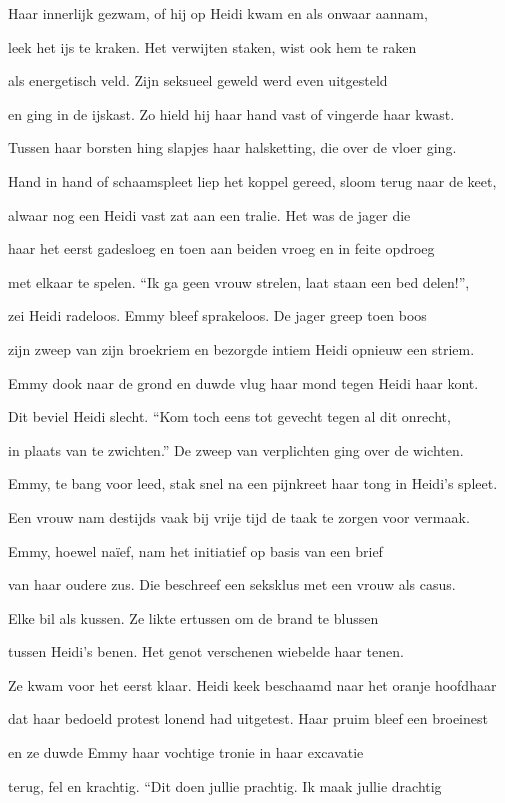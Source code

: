 Haar innerlijk gezwam,
of hij op Heidi kwam
en als onwaar aannam,

leek het ijs te kraken.
Het verwijten staken,
wist ook hem te raken

als energetisch veld.
Zijn seksueel geweld
werd even uitgesteld

en ging in de ijskast.
Zo hield hij haar hand vast
of vingerde haar kwast.

Tussen haar borsten hing
slapjes haar halsketting,
die over de vloer ging.

Hand in hand of schaamspleet
liep het koppel gereed,
sloom terug naar de keet,

alwaar nog een Heidi
vast zat aan een tralie.
Het was de jager die

haar het eerst gadesloeg
en toen aan beiden vroeg
en in feite opdroeg

met elkaar te spelen.
“Ik ga geen vrouw strelen,
laat staan een bed delen!”,

zei Heidi radeloos.
Emmy bleef sprakeloos.
De jager greep toen boos

zijn zweep van zijn broekriem
en bezorgde intiem
Heidi opnieuw een striem.

Emmy dook naar de grond
en duwde vlug haar mond
tegen Heidi haar kont.

Dit beviel Heidi slecht.
“Kom toch eens tot gevecht
tegen al dit onrecht,

in plaats van te zwichten.”
De zweep van verplichten
ging over de wichten.

Emmy, te bang voor leed,
stak snel na een pijnkreet
haar tong in Heidi’s spleet.

Een vrouw nam destijds vaak bij vrije tijd de taak
te zorgen voor vermaak.

Emmy, hoewel naïef,
nam het initiatief
op basis van een brief

van haar oudere zus.
Die beschreef een seksklus
met een vrouw als casus.

Elke bil als kussen.
Ze likte ertussen
om de brand te blussen

tussen Heidi’s benen.
Het genot verschenen
wiebelde haar tenen.

Ze kwam voor het eerst klaar.
Heidi keek beschaamd
naar het oranje hoofdhaar

dat haar bedoeld protest
lonend had uitgetest.
Haar pruim bleef een broeinest

en ze duwde Emmy
haar vochtige tronie
in haar excavatie

terug, fel en krachtig.
“Dit doen jullie prachtig.
Ik maak jullie drachtig

